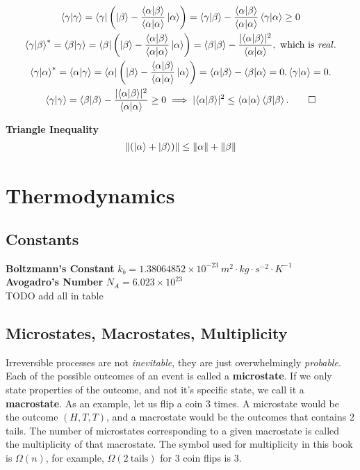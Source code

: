 \documentclass{article}
\begin{document}
\begin{gather*}
    \braket{\gamma|\gamma} = \bra{\gamma} \left (\ket{\beta} - \frac{\braket{\alpha|\beta}}{\braket{\alpha|\alpha}}\ket{\alpha} \right ) =  \braket{\gamma|\beta} - \frac{\braket{\alpha|\beta}}{\braket{\alpha|\alpha}}\braket{\gamma|\alpha} \geq 0\\
    \braket{\gamma|\beta}^{*} = \braket{\beta|\gamma} = \bra{\beta} \left ( \ket{\beta} - \frac{\braket{\alpha|\beta}}{\braket{\alpha|\alpha}}\ket{\alpha}\right ) = \braket{\beta|\beta} - \frac{\lvert \braket{\alpha|\beta} \rvert^{2}}{\braket{\alpha|\alpha}},\ \text{which is \textit{real}}. \\
    \braket{\gamma|\alpha}^{*} = \braket{\alpha|\gamma} = \bra{\alpha} \left ( \ket{\beta} - \frac{\braket{\alpha|\beta}}{\braket{\alpha|\alpha}}\ket{\alpha}\right ) = \braket{\alpha|\beta} - \braket{\beta|\alpha} = 0. \braket{\gamma|\alpha} = 0. \\
    \braket{\gamma|\gamma} = \braket{\beta|\beta} - \frac{\lvert \braket{\alpha|\beta} \rvert^{2}}{\braket{\alpha|\alpha}} \geq 0 \implies 
    \lvert \braket{\alpha|\beta} \rvert^{2} \leq \braket{\alpha|\alpha} \braket{\beta|\beta}. \qed
\end{gather*}

\noindent \textbf{Triangle Inequality} \\
\begin{gather*}
    \lVert (\ket{\alpha} + \ket{\beta}) \rVert \leq \lVert \alpha \rVert + \lVert \beta \rVert
\end{gather*}

\newpage
\section{Thermodynamics}

\subsection{Constants}
\noindent \textbf{Boltzmann's Constant} \quad $k_{b} = 1.38064852 \times 10^{-23}\ m^2 \cdot kg \cdot s^{-2} \cdot K^{-1}$\\
\noindent \textbf{Avogadro's Number} \quad $N_{A} = 6.023 \times 10^{23}$ \\
\noindent TODO add all in table


\subsection{Microstates, Macrostates, Multiplicity}
Irreversible processes are not \textit{inevitable}, they are just overwhelmingly \textit{probable}. Each of the possible outcomes of an event is called a \textbf{microstate}. If we only state properties of the outcome, and not it's specific state, we call it a \textbf{macrostate}. As an example, let us flip a coin 3 times. A microstate would be the outcome $(H,T,T)$, and a macrostate would be the outcomes that contains 2 tails. The number of microstates corresponding to a given macrostate is called the multiplicity of that macrostate. The symbol used for multiplicity in this book is $\Omega(n)$, for example, $\Omega(2\ \text{tails})$ for 3 coin flips is 3. 
\end{document}
